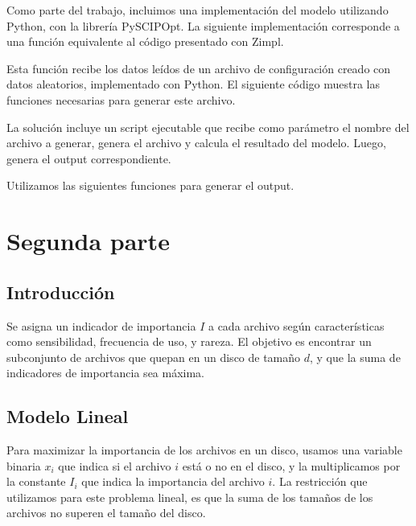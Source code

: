\documentclass[11pt, a4paper, pdftex]{article}
\begin{document}
Como parte del trabajo, incluimos una implementación del modelo utilizando
Python, con la librería PySCIPOpt. La siguiente implementación corresponde 
a una función equivalente al código presentado con Zimpl.



\newpage

Esta función recibe los datos leídos de un archivo de configuración creado 
con datos aleatorios, implementado con Python. El siguiente código 
muestra las funciones necesarias para generar este archivo.



\newpage

La solución incluye un script ejecutable que recibe como parámetro el nombre del 
archivo a generar, genera el archivo y calcula el resultado del modelo. Luego, 
genera el output correspondiente.



\newpage

Utilizamos las siguientes funciones para generar el output.



\newpage
\section{Segunda parte}

\subsection{Introducción}

Se asigna un indicador de importancia $I$ a cada archivo según
características como sensibilidad, frecuencia de uso, y rareza. El
objetivo es encontrar un subconjunto de archivos que quepan en un disco
de tamaño $d$, y que la suma de indicadores de importancia sea máxima.

\subsection{Modelo Lineal}

Para maximizar la importancia de los archivos en un disco, usamos una
variable binaria $x_i$ que indica si el archivo $i$ está o no en el
disco, y la multiplicamos por la constante $I_{i}$ que indica la
importancia del archivo $i$. La restricción que utilizamos para este
problema lineal, es que la suma de los tamaños de los archivos no superen
el tamaño del disco. 
\end{document}
